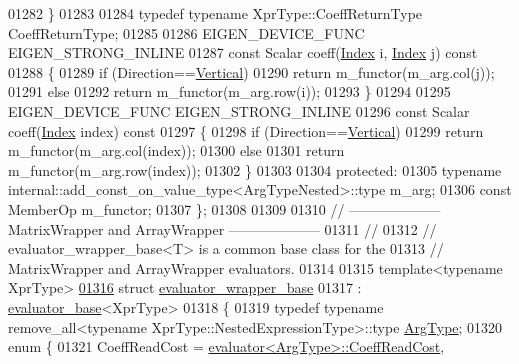\begin{DoxyCode}
01282   \}
01283 
01284   \textcolor{keyword}{typedef} \textcolor{keyword}{typename} XprType::CoeffReturnType CoeffReturnType;
01285 
01286   EIGEN\_DEVICE\_FUNC EIGEN\_STRONG\_INLINE
01287   \textcolor{keyword}{const} Scalar coeff(\hyperlink{namespace_eigen_a62e77e0933482dafde8fe197d9a2cfde}{Index} i, \hyperlink{namespace_eigen_a62e77e0933482dafde8fe197d9a2cfde}{Index} j)\textcolor{keyword}{ const}
01288 \textcolor{keyword}{  }\{
01289     \textcolor{keywordflow}{if} (Direction==\hyperlink{group__enums_ggad49a7b3738e273eb00932271b36127f7addca718e0564723df21d61b94b1198be}{Vertical})
01290       \textcolor{keywordflow}{return} m\_functor(m\_arg.col(j));
01291     \textcolor{keywordflow}{else}
01292       \textcolor{keywordflow}{return} m\_functor(m\_arg.row(i));
01293   \}
01294 
01295   EIGEN\_DEVICE\_FUNC EIGEN\_STRONG\_INLINE
01296   \textcolor{keyword}{const} Scalar coeff(\hyperlink{namespace_eigen_a62e77e0933482dafde8fe197d9a2cfde}{Index} index)\textcolor{keyword}{ const}
01297 \textcolor{keyword}{  }\{
01298     \textcolor{keywordflow}{if} (Direction==\hyperlink{group__enums_ggad49a7b3738e273eb00932271b36127f7addca718e0564723df21d61b94b1198be}{Vertical})
01299       \textcolor{keywordflow}{return} m\_functor(m\_arg.col(index));
01300     \textcolor{keywordflow}{else}
01301       \textcolor{keywordflow}{return} m\_functor(m\_arg.row(index));
01302   \}
01303 
01304 \textcolor{keyword}{protected}:
01305   \textcolor{keyword}{typename} internal::add\_const\_on\_value\_type<ArgTypeNested>::type m\_arg;
01306   \textcolor{keyword}{const} MemberOp m\_functor;
01307 \};
01308 
01309 
01310 \textcolor{comment}{// -------------------- MatrixWrapper and ArrayWrapper --------------------}
01311 \textcolor{comment}{//}
01312 \textcolor{comment}{// evaluator\_wrapper\_base<T> is a common base class for the}
01313 \textcolor{comment}{// MatrixWrapper and ArrayWrapper evaluators.}
01314 
01315 \textcolor{keyword}{template}<\textcolor{keyword}{typename} XprType>
\hyperlink{struct_eigen_1_1internal_1_1evaluator__wrapper__base}{01316} \textcolor{keyword}{struct }\hyperlink{struct_eigen_1_1internal_1_1evaluator__wrapper__base}{evaluator\_wrapper\_base}
01317   : \hyperlink{struct_eigen_1_1internal_1_1evaluator__base}{evaluator\_base}<XprType>
01318 \{
01319   \textcolor{keyword}{typedef} \textcolor{keyword}{typename} remove\_all<typename XprType::NestedExpressionType>::type 
      \hyperlink{group___sparse_core___module_class_eigen_1_1_triplet}{ArgType};
01320   \textcolor{keyword}{enum} \{
01321     CoeffReadCost = \hyperlink{struct_eigen_1_1internal_1_1evaluator}{evaluator<ArgType>::CoeffReadCost},

\end{DoxyCode}
